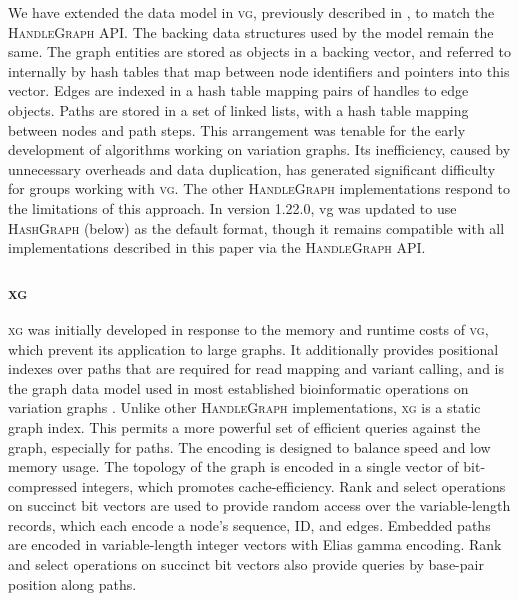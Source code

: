 \documentclass{article}
\begin{document}
We have extended the data model in \textsc{vg}, previously described in \cite{Garrison_2018}, to match the \textsc{HandleGraph} API.
The backing data structures used by the model remain the same.
The graph entities are stored as objects in a backing vector, and referred to internally by hash tables that map between node identifiers and pointers into this vector.
Edges are indexed in a hash table mapping pairs of handles to edge objects.
Paths are stored in a set of linked lists, with a hash table mapping between nodes and path steps.
This arrangement was tenable for the early development of algorithms working on variation graphs.
Its inefficiency, caused by unnecessary overheads and data duplication, has generated significant difficulty for groups working with \textsc{vg}.
The other \textsc{HandleGraph} implementations respond to the limitations of this approach.
In version 1.22.0, vg was updated to use \textsc{HashGraph} (below) as the default format, though it remains compatible with all implementations described in this paper via the \textsc{HandleGraph} API.


\subsubsection{\textsc{xg}}

\textsc{xg} was initially developed in response to the memory and runtime costs of \textsc{vg}, which prevent its application to large graphs.
It additionally provides positional indexes over paths that are required for read mapping and variant calling, and is the graph data model used in most established bioinformatic operations on variation graphs \cite{Garrison_2018,hickey2020genotyping}.
Unlike other \textsc{HandleGraph} implementations, \textsc{xg} is a static graph index.
This permits a more powerful set of efficient queries against the graph, especially for paths.
The encoding is designed to balance speed and low memory usage.
The topology of the graph is encoded in a single vector of bit-compressed integers, which promotes cache-efficiency.
Rank and select operations on succinct bit vectors are used to provide random access over the variable-length records, which each encode a node's sequence, ID, and edges.
Embedded paths are encoded in variable-length integer vectors with Elias gamma encoding.
Rank and select operations on succinct bit vectors also provide queries by base-pair position along paths.
\end{document}
